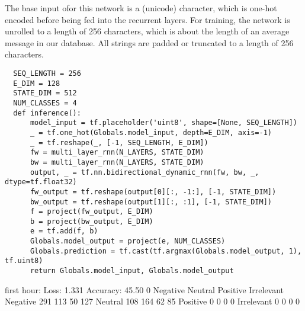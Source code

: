 \documentclass[10pt]{amsart}
\theoremstyle{definition}
\begin{document}


The base input ofor this network is a (unicode) character, which is one-hot encoded before being fed into the recurrent layers.  For training, the network is unrolled to a length of 256 characters, which is about the length of an average
message in our database.  All strings are padded or truncated to a length of 256 characters.


\begin{verbatim}
  SEQ_LENGTH = 256
  E_DIM = 128
  STATE_DIM = 512
  NUM_CLASSES = 4
  def inference():
      model_input = tf.placeholder('uint8', shape=[None, SEQ_LENGTH])
      _ = tf.one_hot(Globals.model_input, depth=E_DIM, axis=-1)
      _ = tf.reshape(_, [-1, SEQ_LENGTH, E_DIM])
      fw = multi_layer_rnn(N_LAYERS, STATE_DIM)
      bw = multi_layer_rnn(N_LAYERS, STATE_DIM)
      output, _ = tf.nn.bidirectional_dynamic_rnn(fw, bw, _, dtype=tf.float32)
      fw_output = tf.reshape(output[0][:, -1:], [-1, STATE_DIM])
      bw_output = tf.reshape(output[1][:, :1], [-1, STATE_DIM])
      f = project(fw_output, E_DIM)
      b = project(bw_output, E_DIM)
      e = tf.add(f, b)
      Globals.model_output = project(e, NUM_CLASSES)
      Globals.prediction = tf.cast(tf.argmax(Globals.model_output, 1), tf.uint8)
      return Globals.model_input, Globals.model_output
\end{verbatim}

first hour:
Loss: 1.331 Accuracy: 45.50%
0	Negative	Neutral	Positive	Irrelevant
Negative	291	113	50	127
Neutral	108	164	62	85
Positive	0	0	0	0
Irrelevant	0	0	0	0
\end{document}
